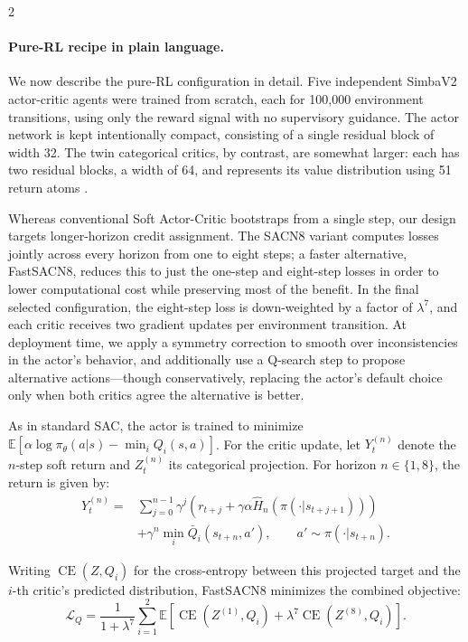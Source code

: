 \begin{multicols}{2}
\paragraph{Pure-RL recipe in plain language.}
We now describe the pure-RL configuration in detail. Five independent
SimbaV2 actor-critic agents were trained from scratch, each for
100{,}000 environment transitions, using only the reward signal with
no supervisory guidance. The actor network is kept intentionally
compact, consisting of a single residual block of width 32. The twin
categorical critics, by contrast, are somewhat larger: each has two
residual blocks, a width of 64, and represents its value distribution
using 51 return atoms \cite{bellemare2017distributional}.

Whereas conventional Soft Actor-Critic bootstraps from a single step,
our design targets longer-horizon credit assignment. The SACN8
variant computes losses jointly across every horizon from one to
eight steps; a faster alternative, FastSACN8, reduces this to just the
one-step and eight-step losses in order to lower computational cost
while preserving most of the benefit. In the final selected
configuration, the eight-step loss is down-weighted by a factor of
$\lambda^7$, and each critic receives two gradient updates per
environment transition. At deployment time, we apply a symmetry
correction to smooth over inconsistencies in the actor's behavior, and
additionally use a Q-search step to propose alternative actions—though
conservatively, replacing the actor's default choice only when both
critics agree the alternative is better.

As in standard SAC, the actor is trained to minimize
$\mathbb E[\alpha\log\pi_\theta(a|s)-\min_iQ_i(s,a)]$. For the critic
update, let $Y_t^{(n)}$ denote the $n$-step soft return and $Z_t^{(n)}$
its categorical projection. For horizon $n\in\{1,8\}$, the return is
given by:
$$\begin{aligned}
Y_t^{(n)}={}&\sum_{j=0}^{n-1}\gamma^j
\left(r_{t+j}+\gamma\alpha\widehat H_n(\pi(\cdot|s_{t+j+1}))\right)\\
&+\gamma^n\min_i\bar Q_i(s_{t+n},a'),\qquad a'\sim\pi(\cdot|s_{t+n}).
\end{aligned}$$

Writing $\operatorname{CE}(Z,Q_i)$ for the cross-entropy between this
projected target and the $i$-th critic's predicted distribution,
FastSACN8 minimizes the combined objective:
$$\mathcal L_Q=
\frac{1}{1+\lambda^7}
\sum_{i=1}^{2}\mathbb E\!\left[
\operatorname{CE}\!\left(Z^{(1)},Q_i\right)+
\lambda^7\operatorname{CE}\!\left(Z^{(8)},Q_i\right)
\right].$$


\end{multicols}
